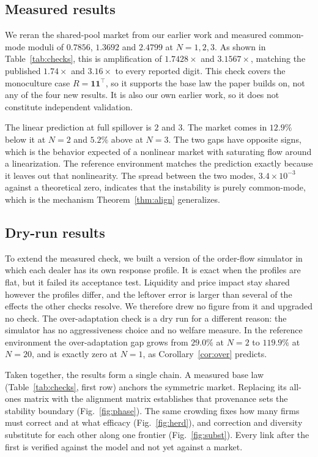 \documentclass[conference]{IEEEtran}
\theoremstyle{definition}
\newcommand{\ones}{\mathbf{1}\mathbf{1}^{\top}}
\begin{document}
\subsection{Measured results}
We reran the shared-pool market from our earlier work \cite{reflex2026} and
measured common-mode moduli of $0.7856$, $1.3692$ and $2.4799$ at
$N = 1, 2, 3$. As shown in Table~\ref{tab:checks}, this is amplification of
$1.7428\times$ and $3.1567\times$, matching the published $1.74\times$ and
$3.16\times$ to every reported digit. This check covers the monoculture case
$R = \ones$, so it supports the base law the paper builds on, not any of the
four new results. It is also our own earlier work, so it does not constitute
independent validation.

The linear prediction at full spillover is $2$ and $3$. The market comes in
$12.9\%$ below it at $N = 2$ and $5.2\%$ above at $N = 3$. The two gaps have
opposite signs, which is the behavior expected of a nonlinear market with
saturating flow around a linearization. The reference environment matches the
prediction exactly because it leaves out that nonlinearity. The spread between
the two modes, $3.4\times10^{-3}$ against a theoretical zero, indicates that
the instability is purely common-mode, which is the mechanism
Theorem~\ref{thm:align} generalizes.

\subsection{Dry-run results}
To extend the measured check, we built a version of the order-flow simulator
in which each dealer has its own response profile. It is exact when the
profiles are flat, but it failed its acceptance test. Liquidity and price
impact stay shared however the profiles differ, and the leftover error is
larger than several of the effects the other checks resolve. We therefore drew
no figure from it and upgraded no check. The over-adaptation check is a dry
run for a different reason: the simulator has no aggressiveness choice and no
welfare measure. In the reference environment the over-adaptation gap grows
from $29.0\%$ at $N = 2$ to $119.9\%$ at $N = 20$, and is exactly zero at
$N = 1$, as Corollary~\ref{cor:over} predicts.

Taken together, the results form a single chain. A measured base law
(Table~\ref{tab:checks}, first row) anchors the symmetric market. Replacing
its all-ones matrix with the alignment matrix establishes that provenance sets
the stability boundary (Fig.~\ref{fig:phase}). The same crowding fixes how
many firms must correct and at what efficacy (Fig.~\ref{fig:herd}), and
correction and diversity substitute for each other along one frontier
(Fig.~\ref{fig:subst}). Every link after the first is verified against the
model and not yet against a market.
\end{document}
